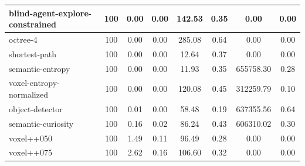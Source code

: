 \begin{table}
\begin{longtable}{|l|c|c| c|c| c|c|c|}
        blind-agent-explore-constrained & 100 & {\cellcolor[HTML]{EBF2F0}} \color[HTML]{000000} 0.00 & {\cellcolor[HTML]{EBF2F0}} \color[HTML]{000000} 0.00 & {\cellcolor[HTML]{A0CEC5}} \color[HTML]{000000} 142.53 & 0.35 & 0.00 & 0.00 \\ \hline
        octree-4 & 100 & {\cellcolor[HTML]{EBF2F0}} \color[HTML]{000000} 0.00 & {\cellcolor[HTML]{EBF2F0}} \color[HTML]{000000} 0.00 & {\cellcolor[HTML]{55AA99}} \color[HTML]{F1F1F1} 285.08 & 0.64 & 0.00 & 0.00 \\ \hline
        shortest-path & 100 & {\cellcolor[HTML]{EBF2F0}} \color[HTML]{000000} 0.00 & {\cellcolor[HTML]{EBF2F0}} \color[HTML]{000000} 0.00 & {\cellcolor[HTML]{E5EFED}} \color[HTML]{000000} 12.64 & 0.37 & 0.00 & 0.00 \\ \hline
        semantic-entropy & 100 & {\cellcolor[HTML]{EBF2F0}} \color[HTML]{000000} 0.00 & {\cellcolor[HTML]{EBF2F0}} \color[HTML]{000000} 0.00 & {\cellcolor[HTML]{E5EFED}} \color[HTML]{000000} 11.93 & 0.35 & 655758.30 & 0.28 \\ \hline
        voxel-entropy-normalized & 100 & {\cellcolor[HTML]{EBF2F0}} \color[HTML]{000000} 0.00 & {\cellcolor[HTML]{EBF2F0}} \color[HTML]{000000} 0.00 & {\cellcolor[HTML]{ACD4CC}} \color[HTML]{000000} 120.08 & 0.45 & 312259.79 & 0.10 \\ \hline
        object-detector & 100 & {\cellcolor[HTML]{EBF2F0}} \color[HTML]{000000} 0.01 & {\cellcolor[HTML]{EBF2F0}} \color[HTML]{000000} 0.00 & {\cellcolor[HTML]{CCE3DF}} \color[HTML]{000000} 58.48 & 0.19 & 637355.56 & 0.64 \\ \hline
        semantic-curiosity & 100 & {\cellcolor[HTML]{EBF2F0}} \color[HTML]{000000} 0.16 & {\cellcolor[HTML]{EBF2F0}} \color[HTML]{000000} 0.02 & {\cellcolor[HTML]{BEDCD6}} \color[HTML]{000000} 86.24 & 0.43 & 606310.02 & 0.30 \\ \hline
        voxel++050 & 100 & {\cellcolor[HTML]{D5E8E4}} \color[HTML]{000000} 1.49 & {\cellcolor[HTML]{EBF2F0}} \color[HTML]{000000} 0.11 & {\cellcolor[HTML]{B8DAD3}} \color[HTML]{000000} 96.49 & 0.28 & 0.00 & 0.00 \\ \hline
        voxel++075 & 100 & {\cellcolor[HTML]{C3DFD9}} \color[HTML]{000000} 2.62 & {\cellcolor[HTML]{D9EAE6}} \color[HTML]{000000} 0.16 & {\cellcolor[HTML]{B3D7D0}} \color[HTML]{000000} 106.60 & 0.32 & 0.00 & 0.00 \\ \hline

\end{longtable}
\end{table}
